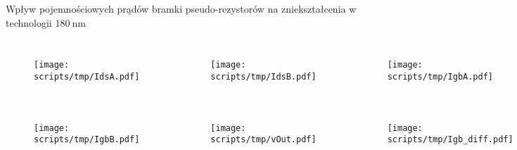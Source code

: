\begin{frame}{Wpływ pojemnościowych prądów bramki pseudo-rezystorów na zniekształcenia  w technologii $\SI{180}{\nano\metre}$}
    \vspace{-5mm} %

    \begin{columns}
        \begin{figure}[H]

            \texttt{[image: scripts/tmp/IdsA.pdf]}

        \end{figure}
        \begin{figure}[H]

            \texttt{[image: scripts/tmp/IdsB.pdf]}

        \end{figure}
        \begin{figure}[H]

            \texttt{[image: scripts/tmp/IgbA.pdf]}

        \end{figure}

    \end{columns}
    \vspace{-10mm} %
    \begin{columns}
        \begin{figure}[H]

            \texttt{[image: scripts/tmp/IgbB.pdf]}

        \end{figure}
        \begin{figure}[H]

            \texttt{[image: scripts/tmp/vOut.pdf]}

        \end{figure}
        \begin{figure}[H]

            \texttt{[image: scripts/tmp/Igb\_diff.pdf]}

        \end{figure}

    \end{columns}
        



\end{frame}


